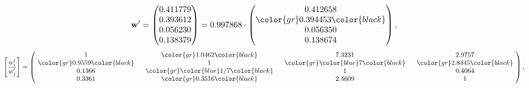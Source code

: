\begin{example}
\begin{equation*}
\mathbf{w}^{\prime} =
\begin{pmatrix}
0.411779\\
0.393612\\
0.056230\\
0.138379
\end{pmatrix} =
0.997868\cdot
\begin{pmatrix}
0.412658\\
\color{gr} 0.394453\color{black} \\
0.056350\\
0.138674
\end{pmatrix},
\end{equation*}
\begin{equation*}
\left[ \frac{{w}^{\prime}_i}{{w}^{\prime}_j} \right] =
\begin{pmatrix}
$\,\,$ 1 $\,\,$ & $\,\,$\color{gr} 1.0462\color{black} $\,\,$ & $\,\,$7.3231$\,\,$ & $\,\,$2.9757$\,\,$ \\
$\,\,$\color{gr} 0.9559\color{black} $\,\,$ & $\,\,$ 1 $\,\,$ & $\,\,$\color{gr} \color{blue} 7\color{black} $\,\,$ & $\,\,$\color{gr} 2.8445\color{black}   $\,\,$ \\
$\,\,$0.1366$\,\,$ & $\,\,$\color{gr} \color{blue}  1/7\color{black} $\,\,$ & $\,\,$ 1 $\,\,$ & $\,\,$0.4064 $\,\,$ \\
$\,\,$0.3361$\,\,$ & $\,\,$\color{gr} 0.3516\color{black} $\,\,$ & $\,\,$2.4609$\,\,$ & $\,\,$ 1  $\,\,$ \\
\end{pmatrix},
\end{equation*}
\end{example}
\newpage
